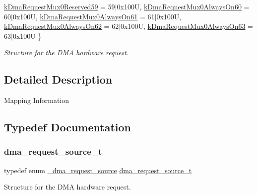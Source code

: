 \begin{DoxyCompactItemize}
\mbox{\hyperlink{group__edma__request_ggafd16b7227cfdebb996c941d293ddd600adaf3ec64c4ecb1e4e377d5eb9ff28643}{k\+Dma\+Request\+Mux0\+Reserved59}} = 59$\vert$0x100U, 
\mbox{\hyperlink{group__edma__request_ggafd16b7227cfdebb996c941d293ddd600a9c0feedbdd307e2ecf1b118f9aa29b44}{k\+Dma\+Request\+Mux0\+Always\+On60}} = 60$\vert$0x100U, 
\mbox{\hyperlink{group__edma__request_ggafd16b7227cfdebb996c941d293ddd600a47ed5bdb2a57ea0b87fbf4ead12e6513}{k\+Dma\+Request\+Mux0\+Always\+On61}} = 61$\vert$0x100U, 
\newline
\mbox{\hyperlink{group__edma__request_ggafd16b7227cfdebb996c941d293ddd600aecd9228b52a4bf0f713213ce67d2610c}{k\+Dma\+Request\+Mux0\+Always\+On62}} = 62$\vert$0x100U, 
\mbox{\hyperlink{group__edma__request_ggafd16b7227cfdebb996c941d293ddd600a38ed8923b04a5e9c07be7bac63a168cb}{k\+Dma\+Request\+Mux0\+Always\+On63}} = 63$\vert$0x100U
 \}
\begin{DoxyCompactList}\small\item\em Structure for the D\+MA hardware request. \end{DoxyCompactList}\end{DoxyCompactItemize}


\subsection{Detailed Description}
Mapping Information 

\subsection{Typedef Documentation}
\mbox{\label{group__edma__request_ga87fac76863c6c941e6363236dde6f58e}} 
\subsubsection{\texorpdfstring{dma\_request\_source\_t}{dma\_request\_source\_t}}
{\footnotesize\ttfamily typedef enum \mbox{\hyperlink{group__edma__request_gafd16b7227cfdebb996c941d293ddd600}{\+\_\+dma\+\_\+request\+\_\+source}}  \mbox{\hyperlink{group__edma__request_ga87fac76863c6c941e6363236dde6f58e}{dma\+\_\+request\+\_\+source\+\_\+t}}}



Structure for the D\+MA hardware request. 


